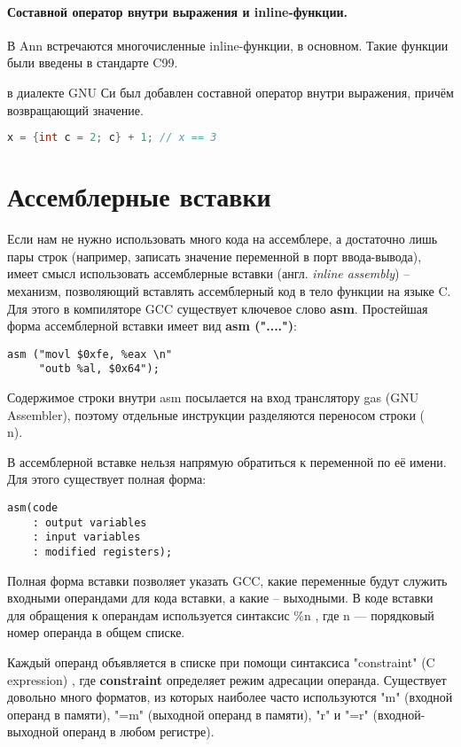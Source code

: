 \paragraph{Составной оператор внутри выражения и inline-функции.} В
Ann встречаются многочисленные inline-функции, в основном.
Такие функции были введены в стандарте C99.

в диалекте GNU Си был добавлен составной оператор внутри выражения, причём возвращающий значение.
\begin{lstlisting}[language=C]
x = {int c = 2; c} + 1; // x == 3
\end{lstlisting}

\section{Ассемблерные вставки}
Если нам не нужно использовать много кода на ассемблере, а достаточно лишь пары строк
(например, записать значение переменной в порт ввода-вывода), имеет смысл
использовать ассемблерные вставки (англ. \textit{inline assembly}) -- механизм, позволяющий вставлять
ассемблерный код в тело функции на языке C. Для этого в компиляторе GCC существует ключевое
слово \textbf{asm}. Простейшая форма ассемблерной вставки имеет вид \textbf{asm ("....")}:
\begin{lstlisting}[language={[x86masm]Assembler}]
asm ("movl $0xfe, %eax \n"
     "outb %al, $0x64");
\end{lstlisting}

Содержимое строки внутри asm посылается на вход транслятору
gas (GNU Assembler), поэтому отдельные инструкции разделяются переносом строки (\\n).

В ассемблерной вставке нельзя напрямую обратиться к переменной
по её имени. Для этого существует полная форма:
\begin{lstlisting}[language={[x86masm]Assembler}]
asm(code
	: output variables
	: input variables
	: modified registers);
\end{lstlisting}

Полная форма вставки позволяет указать GCC, какие переменные
будут служить входными операндами для кода вставки, а какие -- выходными.
В коде вставки для обращения к операндам используется синтаксис
\%n , где n — порядковый номер операнда в общем списке.

Каждый операнд объявляется в списке при помощи синтаксиса
"constraint" (C expression) , где \textbf{constraint} определяет режим
адресации операнда. Существует довольно много форматов, из которых наиболее
часто используются "m" (входной операнд в памяти), "=m" (выходной операнд в
памяти), "r" и "=r" (входной-выходной операнд в любом регистре).

